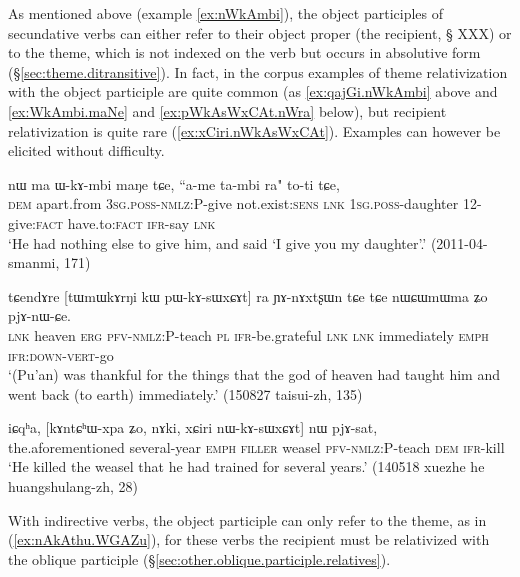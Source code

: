 As mentioned above (example \ref{ex:nWkAmbi}), the object participles of secundative verbs can either refer to their object proper (the recipient, § XXX) or to the theme, which is not indexed on the verb but occurs in absolutive form (§\ref{sec:theme.ditransitive}). In fact, in the corpus examples of theme relativization with the object participle are quite common (as \ref{ex:qajGi.nWkAmbi} above and \ref{ex:WkAmbi.maNe} and \ref{ex:pWkAsWxCAt.nWra} below), but recipient relativization is quite rare (\ref{ex:xCiri.nWkAsWxCAt}). Examples can however be elicited without difficulty.

\begin{exe}
\ex \label{ex:WkAmbi.maNe}
\gll nɯ ma ɯ-kɤ-mbi maŋe tɕe, ``a-me ta-mbi ra" to-ti tɕe, \\
\textsc{dem} apart.from \textsc{3sg}.\textsc{poss}-\textsc{nmlz}:P-give not.exist:\textsc{sens} \textsc{lnk} \textsc{1sg}.\textsc{poss}-daughter 1\fl{}2-give:\textsc{fact}  have.to:\textsc{fact} \textsc{ifr}-say \textsc{lnk} \\
\glt `He had nothing else to give him, and said `I give you my daughter'.' (2011-04-smanmi, 171)
\end{exe}

\begin{exe}
\ex \label{ex:pWkAsWxCAt.nWra}
\gll   tɕendɤre [tɯmɯkɤrŋi kɯ pɯ-kɤ-sɯxɕɤt] ra ɲɤ-nɤxtʂɯn tɕe tɕe nɯɕɯmɯma ʑo pjɤ-nɯ-ɕe. \\
\textsc{lnk} heaven \textsc{erg} \textsc{pfv}-\textsc{nmlz}:P-teach \textsc{pl} \textsc{ifr}-be.grateful \textsc{lnk} \textsc{lnk} immediately \textsc{emph} \textsc{ifr}:\textsc{down}-\textsc{vert}-go \\
\glt `(Pu'an) was thankful for the things that the god of heaven had taught him and went back (to earth) immediately.' (150827 taisui-zh, 135)
\end{exe}

\begin{exe}
\ex \label{ex:xCiri.nWkAsWxCAt}
\gll    iɕqʰa, [kɤntɕʰɯ-xpa ʑo, nɤki, xɕiri nɯ-kɤ-sɯxɕɤt] nɯ pjɤ-sat, \\
 the.aforementioned several-year \textsc{emph} \textsc{filler} weasel \textsc{pfv}-\textsc{nmlz}:P-teach \textsc{dem} \textsc{ifr}-kill \\
\glt `He killed the weasel that he had trained for several years.'  (140518 xuezhe he huangshulang-zh, 28)
\end{exe}

With indirective verbs, the object participle can only refer to the theme, as in (\ref{ex:nAkAthu.WGAZu}), for these verbs the recipient must be relativized with the oblique participle  (§\ref{sec:other.oblique.participle.relatives}).

